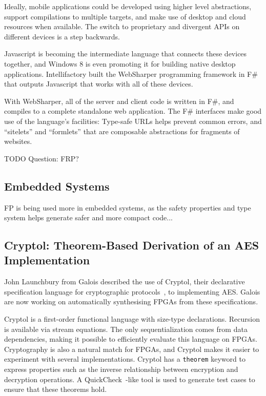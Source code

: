 \documentclass{jfp1}
\begin{document}
Ideally, mobile applications could be developed using higher level abstractions, 
support compilations to multiple targets, and make use of desktop
and cloud resources when available. The switch to proprietary and divergent 
APIs on different devices is a step backwards.

Javascript is becoming the intermediate language that connects these devices
together, and Windows 8 is even promoting it for building native desktop
applications. Intellifactory built the WebSharper programming framework in F\#
that outputs Javascript that works with all of these devices.

With WebSharper, all of the server and client code is written in F\#, and
compiles to a complete standalone web application. The F\# interfaces make 
good use of the language's facilities: Type-safe URLs helps prevent common errors, 
and ``sitelets'' and ``formlets'' that are composable abstractions for fragments of websites.

TODO Question: FRP?

\subsection{Embedded Systems}

FP is being used more in embedded systems, as the safety properties and type system helps generate safer and more compact code...

\subsection{Cryptol: Theorem-Based Derivation of an AES Implementation}

John Launchbury from Galois described the use of Cryptol, their declarative specification language
for cryptographic protocols~\cite{xxx}, to implementing AES. Galois are now working on automatically
synthesising FPGAs from these specifications.

Cryptol is a first-order functional language with size-type declarations.
Recursion is available via stream equations.  The only sequentialization
comes from data dependencies, making it possible to efficiently evaluate this
language on FPGAs. Cryptography is also a natural match for FPGAs, and Cryptol
makes it easier to experiment with several implementations. Cryptol has a {\tt theorem} 
keyword to express properties such as the inverse relationship between encryption 
and decryption operations. A QuickCheck~\cite{x}-like tool is used to generate test cases
to ensure that these theorems hold.
\end{document}
